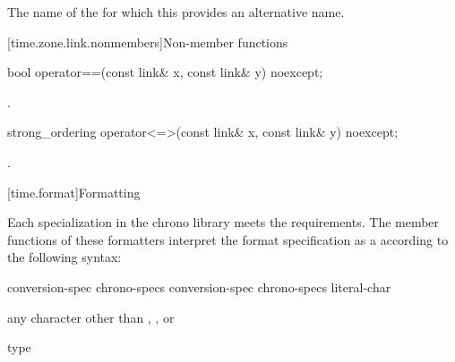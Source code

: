 \begin{itemdescr}
\pnum
\returns
The name of the  for which
this  provides an alternative name.
\end{itemdescr}

[time.zone.link.nonmembers]{Non-member functions}

%
\begin{itemdecl}
bool operator==(const link& x, const link& y) noexcept;
\end{itemdecl}

\begin{itemdescr}
\pnum
\returns
{}.
\end{itemdescr}

%
\begin{itemdecl}
strong_ordering operator<=>(const link& x, const link& y) noexcept;
\end{itemdecl}

\begin{itemdescr}
\pnum
\returns
{}.
\end{itemdescr}

[time.format]{Formatting}

\pnum
Each  specialization
in the chrono library
meets the  requirements.
The  member functions of these formatters
interpret the format specification
as a 
according to the following syntax:

\begin{ncbnf}
\br
       
\end{ncbnf}

\begin{ncbnf}
\br
    conversion-spec\br
    chrono-specs conversion-spec\br
    chrono-specs literal-char
\end{ncbnf}

\begin{ncbnf}
\br
    \textnormal{any character other than \tcode{\{}, \tcode{\}}, or \tcode{\%}}
\end{ncbnf}

\begin{ncbnf}
\br
    \terminal{\%}  type
\end{ncbnf}

